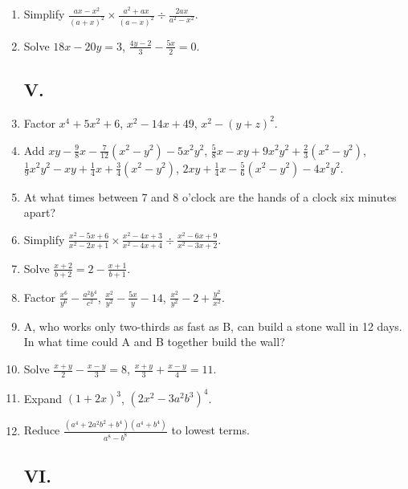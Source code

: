 \documentclass{book}
\begin{document}
\begin{enumerate}
\item Simplify $\displaystyle \frac{ax-x^2}{\left(a+x\right)^2}
\times \frac{a^2+ax}{\left(a-x\right)^2} \div
\frac{2ax}{a^2-x^2}$.

\item Solve $18x-20y = 3$, $\displaystyle
\frac{4y-2}{3}-\frac{5x}{2}= 0$.

\subsection*{V.}

\item Factor $x^4+5x^2+6$, $x^2-14x+49$, $x^2-\left(y+z\right)^2$.

\item Add $xy-\frac{9}{8}x-\frac{7}{12}(x^2-y^2)-5x^2y^2$, $\frac{5}{8}x-xy+9x^2y^2
+\frac{2}{3}(x^2-y^2)$, $\frac{1}{9}x^2y^2-xy+\frac{1}{4}x+\frac{3}{4}(x^2-y^2)$, $2xy+\frac{1}{4}x
-\frac{5}{6}(x^2-y^2)-4x^2y^2$.

\item At what times between 7 and 8 o'clock are the
hands of a clock six minutes apart?

\item Simplify $\displaystyle \frac{x^2-5x+6}{x^2-2x+1} \times
\frac{x^2-4x+3}{x^2-4x+4} \div \frac{x^2-6x+9}{x^2-3x+2}$.

\item Solve $\displaystyle \frac{x+2}{b+2}=2-\frac{x+1}{b+1}$.

\item Factor $\displaystyle \frac{x^6}{y^6}-\frac{a^2b^4}{c^2}$,
$\displaystyle \frac{x^2}{y^2}-\frac{5x}{y}-14$, $\displaystyle
\frac{x^2}{y^2}-2+\frac{y^2}{x^2}$.

\item A, who works only two-thirds as fast as B, can
build a stone wall in 12 days. In what time could A
and B together build the wall?

\item Solve $\displaystyle \frac{x+y}{2}-\frac{x-y}{3}=8$,
$\frac{x+y}{3}+\frac{x-y}{4}=11$.

\item Expand $\left(1+2x\right)^3$, $\left(2x^2-3a^2b^3\right)^4$.

\item Reduce $\displaystyle
\frac{(a^4+2a^2b^2+b^4)(a^4+b^4)}{a^8-b^8}$ to lowest terms.

\subsection*{VI.}


\end{enumerate}
\end{document}

